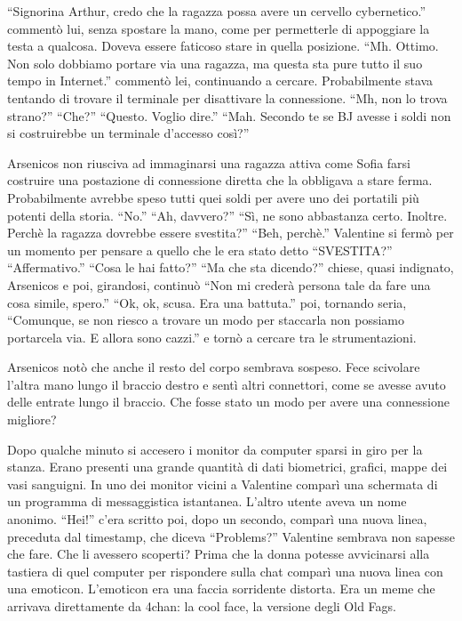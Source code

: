    ``Signorina Arthur, credo che la ragazza possa avere un cervello cybernetico.'' commentò lui, senza spostare la
    mano, come per permetterle di appoggiare la testa a qualcosa. Doveva essere faticoso stare in quella posizione.
    ``Mh. Ottimo. Non solo dobbiamo portare via una ragazza, ma questa sta pure tutto il suo tempo in Internet.''
    commentò lei, continuando a cercare. Probabilmente stava tentando di trovare il terminale per disattivare la
    connessione. ``Mh, non lo trova strano?'' ``Che?'' ``Questo. Voglio dire.'' ``Mah. Secondo te se BJ avesse i soldi
    non si costruirebbe un terminale d'accesso così?''

    Arsenicos non riusciva ad immaginarsi una ragazza attiva come Sofia farsi costruire una postazione di connessione
    diretta che la obbligava a stare ferma. Probabilmente avrebbe speso tutti quei soldi per avere uno dei portatili più
    potenti della storia. ``No.'' ``Ah, davvero?'' ``Sì, ne sono abbastanza certo. Inoltre. Perchè la ragazza dovrebbe
    essere svestita?'' ``Beh, perchè.'' Valentine si fermò per un momento per pensare a quello che le era stato detto
    ``SVESTITA?'' ``Affermativo.'' ``Cosa le hai fatto?'' ``Ma che sta dicendo?'' chiese, quasi indignato, Arsenicos e
    poi, girandosi, continuò ``Non mi crederà persona tale da fare una cosa simile, spero.'' ``Ok, ok, scusa. Era una
    battuta.'' poi, tornando seria, ``Comunque, se non riesco a trovare un modo per staccarla non possiamo portarcela
    via. E allora sono cazzi.'' e tornò a cercare tra le strumentazioni.

    Arsenicos notò che anche il resto del corpo sembrava sospeso. Fece scivolare l'altra mano lungo il braccio destro e
    sentì altri connettori, come se avesse avuto delle entrate lungo il braccio. Che fosse stato un modo per avere una
    connessione migliore?

    Dopo qualche minuto si accesero i monitor da computer sparsi in giro per la stanza. Erano presenti una grande
    quantità di dati biometrici, grafici, mappe dei vasi sanguigni. In uno dei monitor vicini a Valentine comparì una
    schermata di un programma di messaggistica istantanea. L'altro utente aveva un nome anonimo. ``Hei!'' c'era scritto
    poi, dopo un secondo, comparì una nuova linea, preceduta dal timestamp, che diceva ``Problems?'' Valentine sembrava
    non sapesse che fare. Che li avessero scoperti? Prima che la donna potesse avvicinarsi alla tastiera di quel
    computer per rispondere sulla chat comparì una nuova linea con una emoticon. L'emoticon era una faccia sorridente
    distorta. Era un meme che arrivava direttamente da 4chan: la cool face, la versione degli Old Fags.


